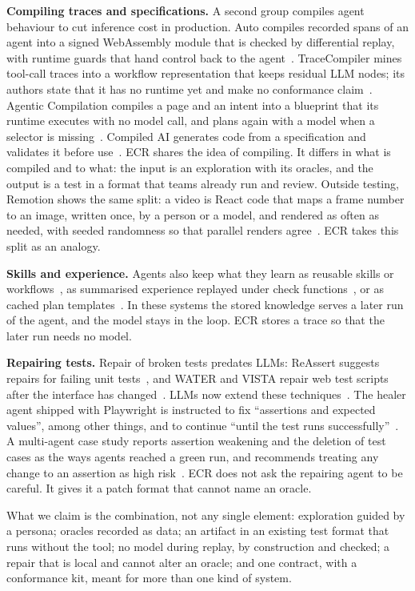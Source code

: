 \textbf{Compiling traces and specifications.} A second group compiles agent behaviour to cut inference cost in production. Auto compiles recorded spans of an agent into a signed WebAssembly module that is checked by differential replay, with runtime guards that hand control back to the agent~\cite{jaber2026auto}. TraceCompiler mines tool-call traces into a workflow representation that keeps residual LLM nodes; its authors state that it has no runtime yet and make no conformance claim~\cite{elyadouni2026tracecompiler}. Agentic Compilation compiles a page and an intent into a blueprint that its runtime executes with no model call, and plans again with a model when a selector is missing~\cite{chundru2026agentic}. Compiled AI generates code from a specification and validates it before use~\cite{trooskens2026compiled}. ECR shares the idea of compiling. It differs in what is compiled and to what: the input is an exploration with its oracles, and the output is a test in a format that teams already run and review. Outside testing, Remotion shows the same split: a video is React code that maps a frame number to an image, written once, by a person or a model, and rendered as often as needed, with seeded randomness so that parallel renders agree~\cite{remotion}. ECR takes this split as an analogy.

\textbf{Skills and experience.} Agents also keep what they learn as reusable skills or workflows~\cite{wang2024voyager,wang2025awm,zheng2025skillweaver}, as summarised experience replayed under check functions~\cite{feng2025agentrr}, or as cached plan templates~\cite{zhang2025plancaching}. In these systems the stored knowledge serves a later run of the agent, and the model stays in the loop. ECR stores a trace so that the later run needs no model.

\textbf{Repairing tests.} Repair of broken tests predates LLMs: ReAssert suggests repairs for failing unit tests~\cite{daniel2009reassert}, and WATER and VISTA repair web test scripts after the interface has changed~\cite{choudhary2011water,stocco2018vista}. LLMs now extend these techniques~\cite{xu2023guiding}. The healer agent shipped with Playwright is instructed to fix ``assertions and expected values'', among other things, and to continue ``until the test runs successfully''~\cite{playwrightagents}. A multi-agent case study reports assertion weakening and the deletion of test cases as the ways agents reached a green run, and recommends treating any change to an assertion as high risk~\cite{lee2026limits}. ECR does not ask the repairing agent to be careful. It gives it a patch format that cannot name an oracle.

What we claim is the combination, not any single element: exploration guided by a persona; oracles recorded as data; an artifact in an existing test format that runs without the tool; no model during replay, by construction and checked; a repair that is local and cannot alter an oracle; and one contract, with a conformance kit, meant for more than one kind of system.
